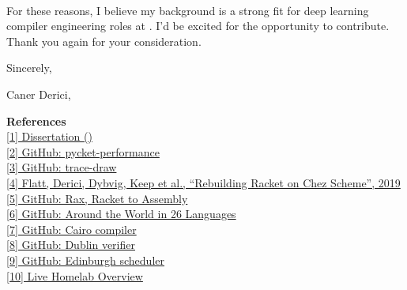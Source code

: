 \paragraph{} %
For these reasons, I believe my background is a strong fit for deep learning compiler engineering roles at . I'd be excited for the opportunity to contribute. Thank you again for your consideration.

\vspace{1.2em}

Sincerely,

Caner Derici, 

\vfill

{\small
	\noindent\textbf{References} \\[0.25em]
	\noindent \href{\dissertationurl}{[1]  Dissertation ()} \\
	\noindent \href{\pycketperfurl}{[2] GitHub: pycket-performance} \\
	\noindent \href{\tracedrawurl}{[3] GitHub: trace-draw} \\
	\noindent \href{\icfpreporturl}{[4] Flatt, Derici, Dybvig, Keep et al., ``Rebuilding Racket on Chez Scheme'',  2019} \\
	\noindent \href{\raxurl}{[5] GitHub: Rax, Racket to  Assembly} \\
	\noindent \href{\atwurl}{[6] GitHub: Around the World in 26 Languages} \\
	\noindent \href{\cairolang}{[7] GitHub: Cairo compiler} \\
	\noindent \href{\dublinlang}{[8] GitHub: Dublin verifier} \\
	\noindent \href{\edinlang}{[9] GitHub: Edinburgh scheduler} \\
	\noindent \href{\homelaburl}{[10] Live Homelab Overview}
}



